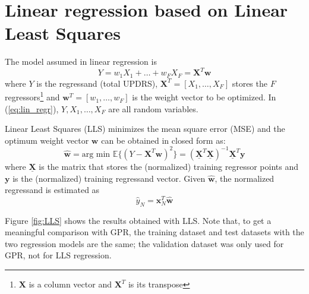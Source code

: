 \documentclass[12pt]{article}
\begin{document}
\section{Linear regression based on Linear Least Squares}
The model assumed in linear regression is
\begin{equation}
Y=w_1X_1+\ldots +w_{F}X_{F}=\mathbf{X}^T\mathbf{w}
\label{eq:lin_regr}
\end{equation}
where $Y$ is the regressand (total UPDRS), $\mathbf{X}^T=[X_1, \ldots, X_{F}]$ stores the $F$ regressors\footnote{$\mathbf{X}$ is a column vector and $\mathbf{X}^T$ is its transpose} and $\mathbf{w}^T=[w_1,\ldots,w_{F}]$ is the weight vector to be optimized. In (\ref{eq:lin_regr}), $Y, X_1, \ldots, X_{F}$ are all random variables.

Linear Least Squares (LLS) minimizes  the mean square error (MSE) and the optimum weight vector $\mathbf{w}$ can be obtained in closed form as:
\begin{equation}
\hat{\mathbf{w}}=\mbox{arg min }\mathbb{E}\{(Y-\mathbf{X}^T\mathbf{w})^2\}  =\left(\mathbf{\underline{X}}^T\mathbf{\underline{X}} \right)^{-1}\mathbf{\underline{X}}^T \mathbf{y}
\end{equation}
where $\mathbf{\underline{X}}$ is the matrix that stores the (normalized) training regressor points and $\mathbf{y}$ is the (normalized) training regressand vector.
Given $\hat{\mathbf{w}}$, the normalized regressand is estimated as
\begin{equation}
\hat{y}_N=\mathbf{x}_N^T\hat{\mathbf{w}}
\end{equation}

Figure \ref{fig:LLS} shows the results obtained with LLS. Note that, to get a meaningful comparison with GPR, the training dataset and test datasets with the two regression models are the same; the validation dataset was only used for GPR, not for LLS regression.
\end{document}
